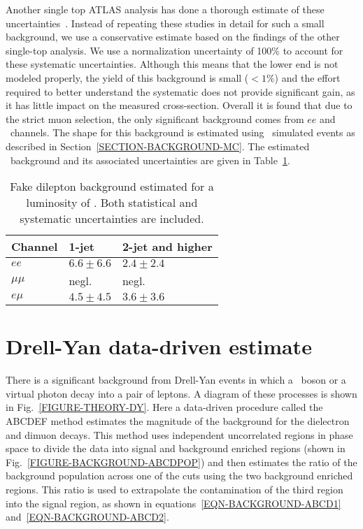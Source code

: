 Another single top ATLAS analysis has done a thorough estimate of these uncertainties~\cite{LEPJETINTNOTE}. Instead of repeating these studies in detail for such a small background, we use a conservative estimate based on the findings of the other single-top analysis. We use a normalization uncertainty of 100\% to account for these systematic uncertainties. Although this means that the lower end is not modeled properly, the yield of this background is small ($<1\%$) and the effort required to better understand the systematic does not provide significant gain, as it has little impact on the measured cross-section.
 Overall it is found that due to the strict muon selection, the only significant background comes from $ee$ and \emu\ channels. The shape for this background is estimated using \Wjets\ simulated events as described in Section~\ref{SECTION-BACKGROUND-MC}. The estimated \multijet\ background and its associated uncertainties are given in Table~\ref{TABLE-MM-RESULTS}.

\begin{table}[!h]
\begin{center}
   \begin{tabular}{l | ll}
    \hline\hline
    Channel & 1-jet         & 2-jet and higher \\
    \hline\hline
    $ee$       & $6.6\pm 6.6$  & $2.4\pm 2.4$  \\
    $\mu\mu $  & negl.        & negl. \\
    $e\mu$     & $4.5\pm 4.5$  & $3.6\pm 3.6$ \\
    \hline
   \end{tabular}
 \caption{Fake dilepton background estimated for a luminosity of \LUMI. Both statistical and systematic uncertainties are included.}
\label{TABLE-MM-RESULTS}
\end{center}
\end{table}


\section{Drell-Yan data-driven estimate}
\label{SECTION-DY-ESTIMATE}

There is a significant background from Drell-Yan events in which a \Zboson\ boson or a virtual photon decay into a pair of leptons. A diagram of these processes is shown in Fig.~\ref{FIGURE-THEORY-DY}. Here a data-driven procedure called the ABCDEF method estimates the magnitude of the background for the dielectron and dimuon decays. This method uses independent uncorrelated regions in phase space to divide the data into signal and background enriched regions (shown in Fig.~\ref{FIGURE-BACKGROUND-ABCDPOP}) and then estimates the ratio of the background population across one of the cuts using the two background enriched regions. This ratio is used to extrapolate the contamination of the third region into the signal region, as shown in equations~\ref{EQN-BACKGROUND-ABCD1} and~\ref{EQN-BACKGROUND-ABCD2}. 

